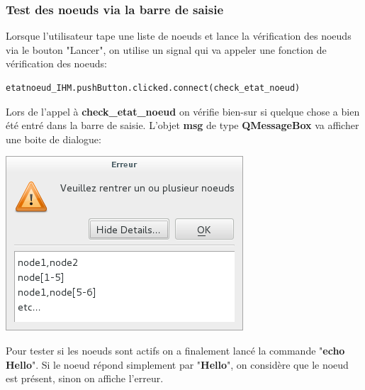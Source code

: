 \documentclass[a4paper,11pt]{article}
\begin{document}
\subsubsection{Test des noeuds via la barre de saisie}
\noindent
Lorsque l'utilisateur tape une liste de noeuds et lance la vérification des noeuds via le bouton "Lancer", on utilise un signal qui va appeler une fonction de vérification des noeuds:\\
\begin{lstlisting}
etatnoeud_IHM.pushButton.clicked.connect(check_etat_noeud)
\end{lstlisting}
Lors de l'appel à \textbf{check\_etat\_noeud } on vérifie bien-sur si quelque chose a bien été entré dans la barre de saisie. L'objet \textbf{msg} de type \textbf{QMessageBox} va afficher une boite de dialogue:\\
\linebreak
\begin{center}
\includegraphics[scale=0.8]{messagebox.png} 
\end{center}
Pour tester si les noeuds sont actifs on a finalement lancé la commande "\textbf{echo Hello}". Si le noeud répond simplement par "\textbf{Hello}", on considère que le noeud est présent, sinon on affiche l'erreur.
 
\end{document}
